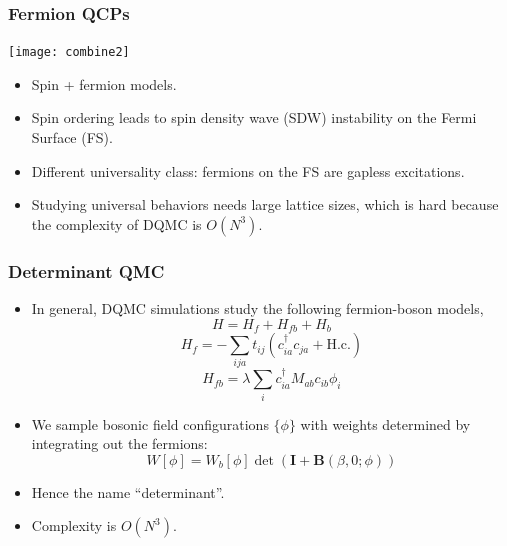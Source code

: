 \documentclass[xcolor=table, 10pt, aspectratio=43]{beamer}
\begin{document}
\begin{frame}
  \frametitle{Fermion QCPs}
  \begin{center}
    \texttt{[image: combine2]}
  \end{center}
  \begin{itemize}
    \item Spin + fermion models.
    \item Spin ordering leads to spin density wave (SDW) instability on the Fermi Surface (FS).
    \item Different universality class: fermions on the FS are gapless excitations.
    \item Studying universal behaviors needs large lattice sizes, which is hard because the complexity of DQMC is $O(N^3)$.
  \end{itemize}
\end{frame}

\begin{frame}
  \frametitle{Determinant QMC}
  \begin{itemize}
    \item In general, DQMC simulations study the following fermion-boson models,
    \[H = H_f + H_{fb} + H_b\]
    \[H_f=-\sum_{ija}t_{ij}\left(c_{ia}^\dagger c_{ja}+\text{H.c.}\right)\]
    \[H_{fb}=\lambda\sum_ic_{ia}^\dagger M_{ab}c_{ib}\phi_i\]
    \item We sample bosonic field configurations $\{\phi\}$ with weights determined by integrating out the fermions:
    \[W[\phi] = W_b[\phi]\det(\mathbf I + \mathbf B(\beta,0;\phi))\]
    \item Hence the name ``determinant''.
    \item Complexity is \alert{$O(N^3)$}.
  \end{itemize}
\end{frame}
\end{document}
